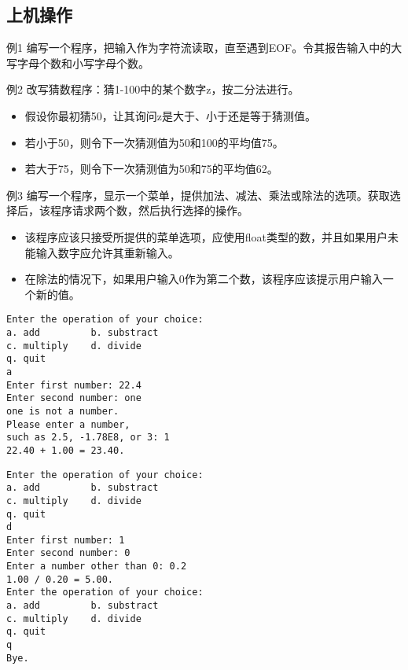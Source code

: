 \subsection{上机操作}

\begin{frame}[fragile]\ft{\subsecname}
\begin{block}{例1}
编写一个程序，把输入作为字符流读取，直至遇到EOF。令其报告输入中的大写字母个数和小写字母个数。
\end{block}
\end{frame}

\begin{frame}[fragile]\ft{\subsecname}
\begin{block}{例2}
改写猜数程序：猜1-100中的某个数字z，按二分法进行。
\begin{itemize}
\item 
假设你最初猜50，让其询问z是大于、小于还是等于猜测值。
\item
若小于50，则令下一次猜测值为50和100的平均值75。
\item
若大于75，则令下一次猜测值为50和75的平均值62。
\end{itemize}
\end{block}
\end{frame}

\begin{frame}[fragile]\ft{\subsecname}
\begin{block}{例3}
编写一个程序，显示一个菜单，提供加法、减法、乘法或除法的选项。获取选择后，该程序请求两个数，然后执行选择的操作。
\begin{itemize}
\item 
该程序应该只接受所提供的菜单选项，应使用float类型的数，并且如果用户未能输入数字应允许其重新输入。
\item
在除法的情况下，如果用户输入0作为第二个数，该程序应该提示用户输入一个新的值。
\end{itemize}
\end{block}
\end{frame}

\begin{frame}[fragile]\ft{\subsecname}
\begin{lstlisting}
Enter the operation of your choice:
a. add         b. substract
c. multiply    d. divide
q. quit
a
Enter first number: 22.4
Enter second number: one
one is not a number.
Please enter a number,
such as 2.5, -1.78E8, or 3: 1
22.40 + 1.00 = 23.40.
\end{lstlisting}
\end{frame}

\begin{frame}[fragile]\ft{\subsecname}
\begin{lstlisting}[backgroundcolor=\color{blue!20}]
Enter the operation of your choice:
a. add         b. substract
c. multiply    d. divide
q. quit
d
Enter first number: 1
Enter second number: 0
Enter a number other than 0: 0.2
1.00 / 0.20 = 5.00.
Enter the operation of your choice:
a. add         b. substract
c. multiply    d. divide
q. quit
q
Bye.
\end{lstlisting}
\end{frame}

